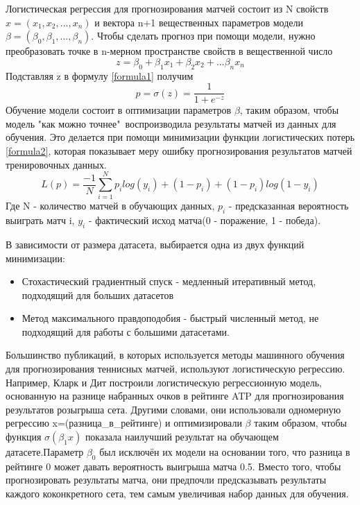 Логистическая регрессия для прогнозирования матчей состоит из N свойств $x=(x_1,x_2, ..., x_n)$ и вектора
n+1 вещественных параметров модели $\beta=(\beta_0,\beta_1,...,\beta_n)$. Чтобы сделать прогноз при помощи модели, нужно преобразовать точке в n-мерном пространстве свойств  в вещественной число
\begin{equation}
z=\beta_0 +\beta_1x_1+\beta_2x_2+...\beta_nx_n
\end{equation}
Подставляя z в формулу \ref{formula1} получим 
\begin{equation}\label{formula1}
p=\sigma(z)=\frac{1}{1 + e^{-z}}
\end{equation}
Обучение модели состоит в оптимизации параметров $\beta$, таким образом, чтобы модель "как можно точнее"\ воспроизводила результаты матчей из данных для обучения. Это делается при помощи минимизации функции логистических потерь \ref{formula2}, которая показывает меру ошибку прогнозирования результатов матчей тренировочных данных.
\begin{equation}\label{formula2}
L(p)=\frac{-1}{N}\sum_{i=1}^Np_ilog(y_i) + (1 - p_i) + (1 - p_i)log(1-y_i)
\end{equation}
Где N - количество матчей в обучающих данных, $p_i$ - предсказанная вероятность выиграть матч i,  $y_i$ - фактический исход матча(0 - поражение, 1 - победа).

 В зависимости от размера датасета, выбирается одна из двух функций минимизации:
 \begin{itemize}
 	\item Стохастический градиентный спуск - медленный итеративный метод, подходящий для больших датасетов
 	\item Метод максимального правдоподобия - быстрый численный метод, не подходящий для работы с большими датасетами.
 \end{itemize}
Большинство публикаций, в которых используется методы машинного обучения для прогнозирования теннисных матчей, используют логистическую регрессию. Например, Кларк и Дит\cite{Book10} построили логистическую регрессионную  модель, основанную на разнице набранных очков в рейтинге ATP для прогнозирования результатов розыгрыша сета. Другими словами, они использовали одномерную регрессию x=(разница\_в\_рейтинге) и оптимизировали $\beta$ таким образом, чтобы функция $\sigma(\beta_1x)$ показала наилучший результат на обучающем датасете.Параметр $\beta_0$ был исключён их модели на основании того, что разница в рейтинге 0 может давать вероятность выигрыша матча 0.5. Вместо того, чтобы прогнозировать результаты матча, они предпочли предсказывать результаты каждого коконкретного  сета, тем самым увеличивая набор данных для обучения.

